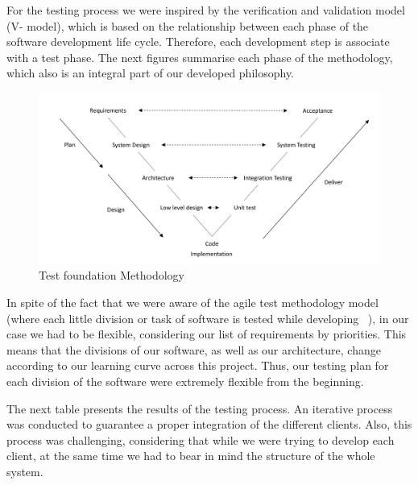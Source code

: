 For the testing process we were inspired by the verification and validation model (V- model), which is based on the relationship between each phase of the software development life cycle. Therefore, each development step is associate with a test phase.   The next figures summarise each phase of the methodology, which also is an integral part of our developed philosophy. 

\begin{figure}[ht]
\centering
\includegraphics[width=1\textwidth]{figs/testing-met}
	\caption{Test foundation Methodology}
	\label{fig:testing}
\end{figure}


In spite of the fact that we were aware of the agile test methodology model (where each little division or task of software is tested while developing ~\cite{rtyeteey}), in our case we had to be flexible, considering our list of requirements by priorities. This means that the divisions of our software, as well as our architecture, change according to our learning curve across this project. Thus, our testing plan for each division of the software were extremely flexible from the beginning.

The next table presents the results of the testing process. An iterative process was conducted to guarantee a proper integration of the different clients.  Also, this process was challenging, considering that while we were trying to develop each client, at the same time we had to bear in mind the structure of the whole system.


